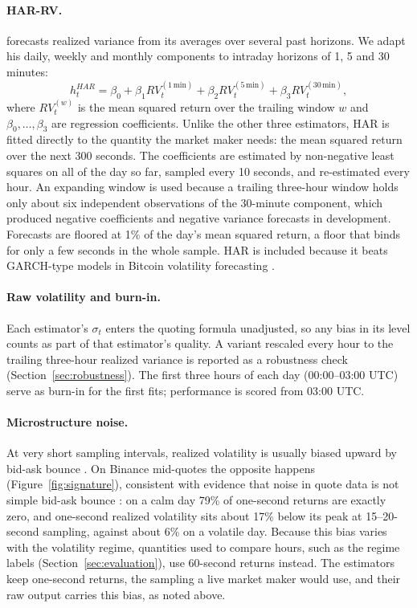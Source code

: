 \documentclass[11pt]{article}
\begin{document}
\paragraph{HAR-RV.}
\citet{corsi2009} forecasts realized variance from its averages over several past horizons. We adapt
his daily, weekly and monthly components to intraday horizons of 1, 5 and 30 minutes:
\begin{equation}
  h_t^{HAR} = \beta_0 + \beta_1 RV_t^{(1\,\text{min})} + \beta_2 RV_t^{(5\,\text{min})}
              + \beta_3 RV_t^{(30\,\text{min})} ,
  \label{eq:har}
\end{equation}
where $RV_t^{(w)}$ is the mean squared return over the trailing window $w$ and $\beta_0,\dots,\beta_3$
are regression coefficients. Unlike the other three
estimators, HAR is fitted directly to the quantity the market maker needs: the mean squared return over
the next 300 seconds. The coefficients are estimated by non-negative least squares on all of the day
so far, sampled every 10 seconds, and re-estimated every hour. An expanding window is used because a
trailing three-hour window holds only about six independent observations of the 30-minute component,
which produced negative coefficients and negative variance forecasts in development. Forecasts are
floored at 1\% of the day's mean squared return, a floor that binds for only a few seconds in the whole
sample. HAR is included because it beats GARCH-type models in Bitcoin volatility forecasting
\citep{aganin2023,bergsli2022}.

\paragraph{Raw volatility and burn-in.}
Each estimator's $\sigma_t$ enters the quoting formula unadjusted, so any bias in its level counts as
part of that estimator's quality. A variant rescaled every hour to the trailing three-hour realized
variance is reported as a robustness check (Section~\ref{sec:robustness}). The first three hours of each
day (00:00--03:00 UTC) serve as burn-in for the first fits; performance is scored from 03:00 UTC.

\paragraph{Microstructure noise.}
At very short sampling intervals, realized volatility is usually biased upward by bid-ask bounce
\citep{bandirussell2008}. On Binance mid-quotes the opposite happens (Figure~\ref{fig:signature}), consistent with evidence that
noise in quote data is not simple bid-ask bounce \citep{hansenlunde2006}: on
a calm day 79\% of one-second returns are exactly zero, and one-second realized volatility sits about
17\% below its peak at 15--20-second sampling, against about 6\% on a volatile day. Because this bias
varies with the volatility regime, quantities used to compare hours, such as the regime labels
(Section~\ref{sec:evaluation}), use 60-second returns instead. The estimators keep one-second returns,
the sampling a live market maker would use, and their raw output carries this bias, as noted above.
\end{document}
